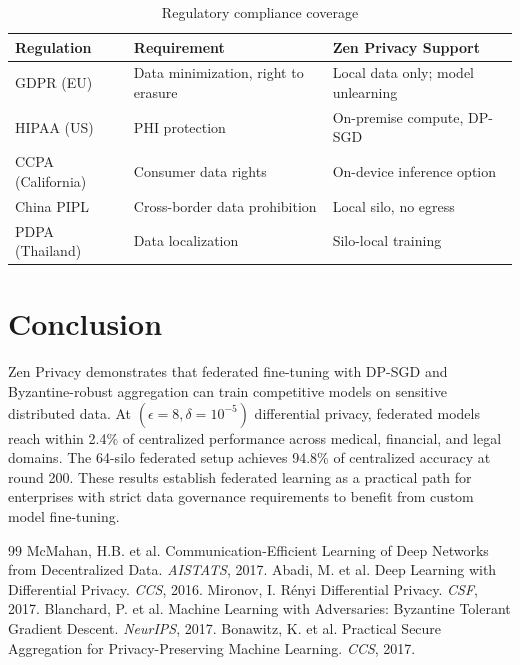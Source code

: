 \documentclass[11pt,a4paper]{article}
\begin{document}
\begin{table}[H]
\centering
\caption{Regulatory compliance coverage}
\label{tab:compliance}
\begin{tabular}{lll}
\toprule
Regulation & Requirement & Zen Privacy Support \\
\midrule
GDPR (EU) & Data minimization, right to erasure & Local data only; model unlearning \\
HIPAA (US) & PHI protection & On-premise compute, DP-SGD \\
CCPA (California) & Consumer data rights & On-device inference option \\
China PIPL & Cross-border data prohibition & Local silo, no egress \\
PDPA (Thailand) & Data localization & Silo-local training \\
\bottomrule
\end{tabular}
\end{table}

\section{Conclusion}

Zen Privacy demonstrates that federated fine-tuning with DP-SGD and Byzantine-robust aggregation can train competitive models on sensitive distributed data. At $(\epsilon=8, \delta=10^{-5})$ differential privacy, federated models reach within 2.4\% of centralized performance across medical, financial, and legal domains. The 64-silo federated setup achieves 94.8\% of centralized accuracy at round 200. These results establish federated learning as a practical path for enterprises with strict data governance requirements to benefit from custom model fine-tuning.

\begin{thebibliography}{99}
 McMahan, H.B. et al. Communication-Efficient Learning of Deep Networks from Decentralized Data. \textit{AISTATS}, 2017.
 Abadi, M. et al. Deep Learning with Differential Privacy. \textit{CCS}, 2016.
 Mironov, I. Rényi Differential Privacy. \textit{CSF}, 2017.
 Blanchard, P. et al. Machine Learning with Adversaries: Byzantine Tolerant Gradient Descent. \textit{NeurIPS}, 2017.
 Bonawitz, K. et al. Practical Secure Aggregation for Privacy-Preserving Machine Learning. \textit{CCS}, 2017.
\end{thebibliography}
\end{document}
